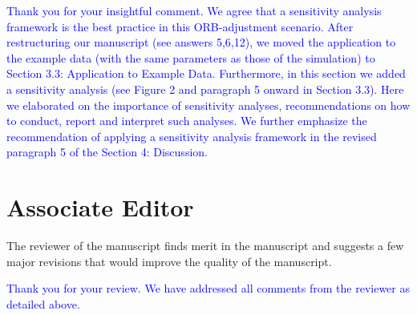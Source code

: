 \documentclass{article}
\begin{document}
\bigskip

\textcolor{blue}{Thank you for your insightful comment. We agree that a sensitivity analysis framework is the best practice in this ORB-adjustment scenario. After restructuring our manuscript (see answers 5,6,12), we moved the application to the example data (with the same parameters as those of the simulation) to Section 3.3: Application to Example Data. Furthermore, in this section we added a sensitivity analysis (see Figure 2 and paragraph 5 onward in Section 3.3). Here we elaborated on the importance of sensitivity analyses, recommendations on how to conduct, report and interpret such analyses. We further emphasize the recommendation of applying a sensitivity analysis framework in the revised paragraph 5 of the Section 4: Discussion.}


\section*{Associate Editor}


The reviewer of the manuscript finds merit in the manuscript and suggests a few major revisions that would improve the quality of the manuscript.

\bigskip

\textcolor{blue}{Thank you for your review. We have addressed all comments from the reviewer as detailed above. }
\end{document}
